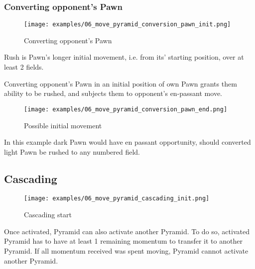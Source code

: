 \clearpage %

\subsubsection*{Converting opponent's Pawn}

\noindent
\begin{wrapfigure}[13]{l}{0.6\textwidth}
\centering
\texttt{[image: examples/06\_move\_pyramid\_conversion\_pawn\_init.png]}
\caption{Converting opponent's Pawn}
\label{fig:06_move_pyramid_conversion_pawn_init}
\end{wrapfigure}
Rush is Pawn's longer initial movement, i.e. from its’ starting position,
over at least 2 fields.

Converting opponent's Pawn in an initial position of own Pawn grants them
ability to be rushed, and subjects them to opponent's en-passant move.

\vspace*{0.05\textheight} %
\noindent
\begin{wrapfigure}{l}{0.6\textwidth}
\centering
\texttt{[image: examples/06\_move\_pyramid\_conversion\_pawn\_end.png]}
\caption{Possible initial movement}
\label{fig:06_move_pyramid_conversion_pawn_end}
\end{wrapfigure}
In this example dark Pawn would have en passant opportunity, should converted
light Pawn be rushed to any numbered field.

\clearpage %

\subsection*{Cascading}

\noindent
\begin{figure}[!h]
\texttt{[image: examples/06\_move\_pyramid\_cascading\_init.png]}
\caption{Cascading start}
\label{fig:06_move_pyramid_cascading_init}
\end{figure}

Once activated, Pyramid can also activate another Pyramid. To do so, activated
Pyramid has to have at least 1 remaining momentum to transfer it to another
Pyramid. If all momentum received was spent moving, Pyramid cannot activate
another Pyramid.

